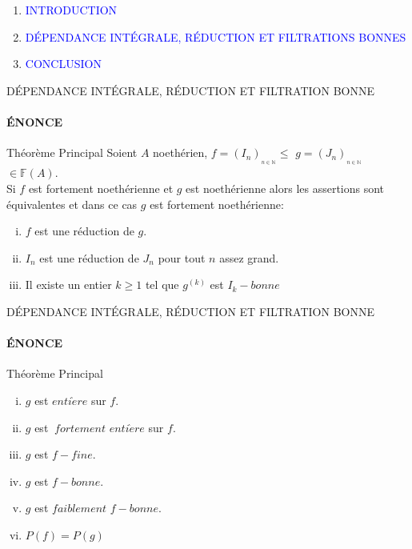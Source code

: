 \documentclass[11pt,a4paper]{beamer}
\begin{document}
	\begin{frame}
		\begin{enumerate}
			\item<0> \textcolor{blue}{INTRODUCTION}\\
			\item<1> \textcolor{blue}{DÉPENDANCE INTÉGRALE, RÉDUCTION ET FILTRATIONS BONNES }\\
			\item<0> \textcolor{blue}{CONCLUSION}\\
		\end{enumerate}
	\end{frame}
	
	\begin{frame}{DÉPENDANCE INTÉGRALE, RÉDUCTION ET FILTRATION BONNE}
		\framesubtitle{ÉNONCE}
		\begin{block}{Théorème Principal}
			Soient $A$ noethérien, $f=(I_{n})_{_{n\in \mathbb{N}}}\leq $ $g=(J_{n})_{_{n\in \mathbb{N}}}$ $ \in \mathbb{F}(A).$ \\ Si $f$ est fortement noethérienne et $g$ est noethérienne alors les assertions sont équivalentes et dans ce cas $g$ est fortement noethérienne:
			\begin{enumerate}[(i)]
				\item $f$ est une réduction de $g.$
				\item $I_{n}$ est une réduction de $J_{n}$ pour tout $n$ assez grand.
				\item Il existe un entier $k\geq 1$ tel que $g^{(k)}$ est $I_{k}-bonne$
			\end{enumerate}
		\end{block}
	\end{frame}
	
	\begin{frame}{DÉPENDANCE INTÉGRALE, RÉDUCTION ET FILTRATION BONNE}
		\framesubtitle{ÉNONCE}
		\begin{block}{Théorème Principal}
			\begin{enumerate}[(iv)]
				\item $g$ est $enti\grave{e}re$ sur $f.$
				\item $g$ est $\ fortement$ $enti\grave{e}re$ sur $f.$
				\item $g$ est $f-fine.$
				\item $g$ est $f-bonne.$
				\item $g$ est $faiblement$ $f-bonne.$
				\item $P(f)=P(g)$
			\end{enumerate}
		\end{block}
	\end{frame}
	
\end{document}
